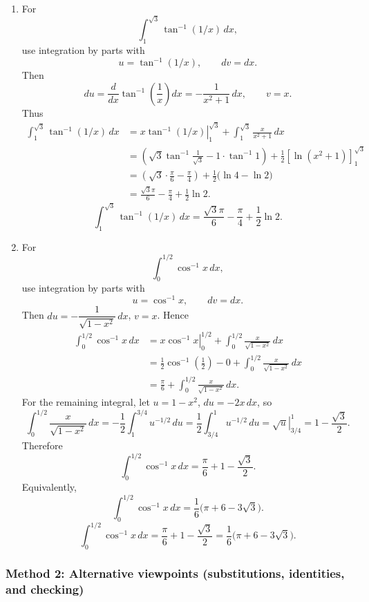 \documentclass[12pt]{article}
\begin{document}
\begin{enumerate}[label=(\alph*)]
\item For
\[
\int_{1}^{\sqrt{3}}\tan^{-1}(1/x)\,dx,
\]
use integration by parts with
\[
u=\tan^{-1}(1/x),\qquad dv=dx.
\]
Then
\[
du = \frac{d}{dx}\tan^{-1}\left(\frac{1}{x}\right)dx
= -\frac{1}{x^{2}+1}\,dx,\qquad v=x.
\]
Thus
\begin{align*}
\int_{1}^{\sqrt{3}}\tan^{-1}(1/x)\,dx
&=\left.x\tan^{-1}(1/x)\right|_{1}^{\sqrt{3}}
+\int_{1}^{\sqrt{3}}\frac{x}{x^{2}+1}\,dx\\
&=\left(\sqrt{3}\tan^{-1}\frac{1}{\sqrt{3}}-1\cdot\tan^{-1}1\right)
+\frac{1}{2}\left[\ln(x^{2}+1)\right]_{1}^{\sqrt{3}}\\
&=\left(\sqrt{3}\cdot\frac{\pi}{6}-\frac{\pi}{4}\right)
+\frac{1}{2}\big(\ln 4-\ln 2\big)\\
&=\frac{\sqrt{3}\pi}{6}-\frac{\pi}{4}+\frac{1}{2}\ln 2.
\end{align*}
\[
\boxed{\displaystyle \int_{1}^{\sqrt{3}}\tan^{-1}(1/x)\,dx
= \frac{\sqrt{3}\pi}{6}-\frac{\pi}{4}+\frac{1}{2}\ln 2.}
\]

\item For
\[
\int_{0}^{1/2}\cos^{-1} x\,dx,
\]
use integration by parts with
\[
u=\cos^{-1}x,\qquad dv=dx.
\]
Then \(du=-\dfrac{1}{\sqrt{1-x^{2}}}\,dx\), \(v=x\). Hence
\begin{align*}
\int_{0}^{1/2}\cos^{-1} x\,dx
&=\left.x\cos^{-1}x\right|_{0}^{1/2}
+\int_{0}^{1/2}\frac{x}{\sqrt{1-x^{2}}}\,dx\\
&=\frac{1}{2}\cos^{-1}\left(\frac{1}{2}\right)-0
+\int_{0}^{1/2}\frac{x}{\sqrt{1-x^{2}}}\,dx\\
&=\frac{\pi}{6}
+\int_{0}^{1/2}\frac{x}{\sqrt{1-x^{2}}}\,dx.
\end{align*}
For the remaining integral, let \(u=1-x^{2}\), \(du=-2x\,dx\), so
\[
\int_{0}^{1/2}\frac{x}{\sqrt{1-x^{2}}}\,dx
= -\frac12\int_{1}^{3/4}u^{-1/2}\,du
= \frac12\int_{3/4}^{1}u^{-1/2}\,du
= \left.\sqrt{u}\right|_{3/4}^{1}
= 1-\frac{\sqrt{3}}{2}.
\]
Therefore
\[
\int_{0}^{1/2}\cos^{-1} x\,dx
= \frac{\pi}{6}+1-\frac{\sqrt{3}}{2}.
\]
Equivalently,
\[
\int_{0}^{1/2}\cos^{-1} x\,dx
= \frac{1}{6}\big(\pi+6-3\sqrt{3}\big).
\]
\[
\boxed{\displaystyle \int_{0}^{1/2}\cos^{-1} x\,dx
= \frac{\pi}{6}+1-\frac{\sqrt{3}}{2}
= \frac{1}{6}\big(\pi+6-3\sqrt{3}\big).}
\]
\end{enumerate}

\subsubsection*{Method 2: Alternative viewpoints (substitutions, identities, and checking)}
\end{document}

